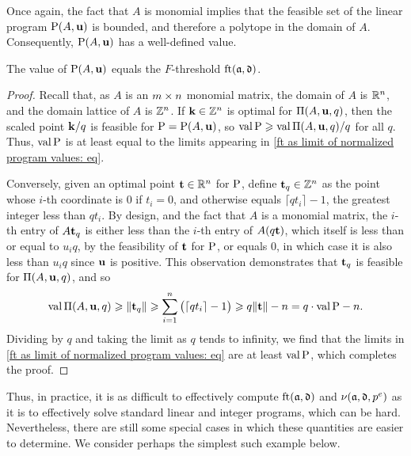 \documentclass{amsart}
\begin{document}
Once again, the fact that $A$ is monomial implies that the feasible set of the linear program $\mathrm{P}(A,\mathbf{u})$ is bounded, and therefore a polytope in the domain of $A$.  Consequently, $\mathrm{P}(A,\mathbf{u})$ has a well-defined value.

\begin{proposition}
\label{ft as val LP: P}
The value of $\mathrm{P}(A, \mathbf{u})$ equals the $F$-threshold $\operatorname{ft}(\mathfrak{a}, \mathfrak{d})$.
\end{proposition}

\begin{proof}
  Recall that, as $A$ is an $m \times n$ monomial matrix, the domain of $A$ is $\mathbb{R}^n$, and the domain lattice of $A$ is $\mathbb{Z}^n$.  If $\mathbf{k} \in \mathbb{Z}^n$ is optimal for $\Pi(A,\mathbf{u},q)$, then the scaled point $\mathbf{k}/q$ is feasible for $\mathrm{P} = \mathrm{P}(A, \mathbf{u})$, so $\operatorname{val} \mathrm{P} \geqslant \operatorname{val} \Pi(A, \mathbf{u}, q)/q$ for all $q$.
   Thus, $\operatorname{val} \mathrm{P}$ is at least equal to the limits appearing in \eqref{ft as limit of normalized program values: eq}.

   Conversely, given an optimal point $\mathbf{t} \in \mathbb{R}^n$ for $\mathrm{P}$,
   define $\mathbf{t}_q \in \mathbb{Z}^n$ as the point whose $i$-th coordinate is $0$ if $t_i=0$, and otherwise equals $\lceil q t_i \rceil - 1$, the greatest integer less than $q t_i$.
   By design, and the fact that $A$ is a monomial matrix, the $i$-th entry of $A \mathbf{t}_q$ is either less than the $i$-th entry of $A (q \mathbf{t})$, which itself is less than or equal to $u_iq$, by the feasibility of $\mathbf{t}$ for $\mathrm{P}$, or equals $0$,  in which case it is also less than $u_i q$ since $\mathbf{u}$ is positive. This observation demonstrates that $\mathbf{t}_q$ is feasible for $\Pi(A, \mathbf{u}, q)$, and so
   \[\operatorname{val} \Pi(A, \mathbf{u}, q) \geqslant \| \mathbf{t}_q \| \geqslant \sum_{i=1}^n \big(\lceil q t_i \rceil - 1\big) \geqslant q \| \mathbf{t} \| -n = q \cdot \operatorname{val} \mathrm{P} - n.\]
   Dividing by $q$ and taking the limit as $q$ tends to infinity, we find that the limits in \eqref{ft as limit of normalized program values: eq} are at least $\operatorname{val} \mathrm{P}$, which completes the proof.
\end{proof}


Thus, in practice, it is as difficult to effectively compute $\operatorname{ft}(\mathfrak{a}, \mathfrak{d})$ and $\nu(\mathfrak{a}, \mathfrak{d}, p^e)$ as it is to effectively solve standard linear and integer programs, which can be hard.  Nevertheless, there are still some special cases in which these quantities are easier to determine.  We consider perhaps the simplest such example below.
\end{document}
